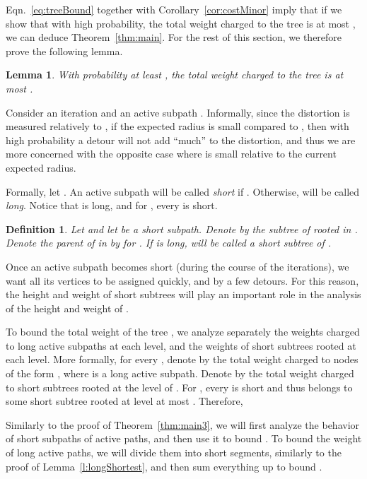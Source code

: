 \documentclass[twoside,leqno,twocolumn]{article}
\newtheorem{definition}[Definition]{Definition}
\newtheorem{lemma}[theorem]{Lemma}
\newtheorem{definition}[theorem]{Definition}
\begin{document}
Eqn.~\eqref{eq:treeBound} together with Corollary~\ref{cor:costMinor} imply that if we show that with high probability, the total weight charged to the tree is at most , we can deduce Theorem~\ref{thm:main}.
For the rest of this section, we therefore prove the following lemma.
\begin{lemma} \label{l:totalWeight}
With probability at least , the total weight charged to the tree is at most .
\end{lemma}

Consider an iteration  and an active subpath . 
Informally, since the distortion is measured relatively to , 
if the expected radius  is small compared to , 
then with high probability a detour will not add ``much'' to the distortion,
and thus we are more concerned with the opposite case 
where  is small relative to the current expected radius.

Formally, let . An active subpath  will be called {\em short} if . Otherwise,  will be called {\em long}. Notice that  is long, and for , every  is short.

\begin{definition}
Let  and let  be a short subpath. Denote by  the subtree of  rooted in . 
Denote the parent of  in  
by  for .
If  is long,  will be called a {\em short subtree} of .
\end{definition}

Once an active subpath becomes short (during the course of the iterations), 
we want all its vertices to be assigned quickly, and by a few detours. 
For this reason, the height and weight of short subtrees will play an important role in the analysis of the height and weight of .

To bound the total weight of the tree , we analyze separately 
the weights charged to long active subpaths at each level, 
and the weights of short subtrees rooted at each level.
More formally, for every , denote by  the total weight charged to nodes of the form , where  is a long active subpath. Denote by  the total weight charged to short subtrees rooted at the level  of . 
For , every  is short and thus  belongs to some short subtree rooted at level at most . Therefore,

Similarly to the proof of Theorem~\ref{thm:main3}, we will first analyze the behavior of short subpaths of active paths, and then use it to bound . 
To bound the weight of long active paths, we will divide them into short segments, similarly to the proof of Lemma~\ref{l:longShortest}, and then sum everything up to bound .
\end{document}
